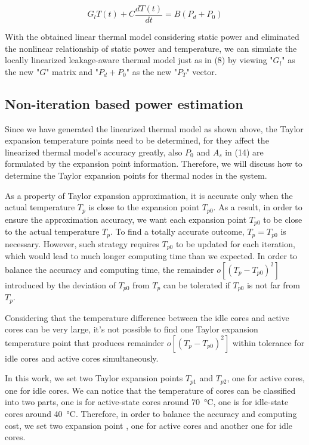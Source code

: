 \begin{equation}\label{gt=bp}
G_{l}T(t) + C\frac{dT(t)}{dt} = B(P_{d} + P_{0})
\end{equation}

With the obtained linear thermal model considering static power and eliminated the nonlinear relationship of static power and temperature, we can simulate the locally linearized leakage-aware thermal model just as in (8) by viewing "$G_{l}$" as the new "$G$" matrix and "$P_{d} + P_{0}$" as the new "$P_{T}$" vector.

\subsection{Non-iteration based power estimation}
Since we have generated the linearized thermal model as shown above, the Taylor expansion temperature points need to be determined, for they affect the linearized thermal model's accuracy greatly, also $P_{0}$ and $A_{s}$ in (14) are formulated by the expansion point information. Therefore, we will discuss how to determine the Taylor expansion points for thermal nodes in the system. 

As a property of Taylor expansion approximation, it is accurate only when the actual temperature $T_{p}$ is close to the expansion point $T_{p0}$. As a result, in order to ensure the approximation accuracy, we want each expansion point $T_{p0}$ to be close to the actual temperature $T_{p}$. To find a totally accurate outcome, $T_{p} = T_{p0}$ is necessary. However, such strategy requires $T_{p0}$ to be updated for each iteration, which would lead to much longer computing time than we expected. In order to balance the accuracy and computing time, the remainder $o[(T_{p}-T_{p0})^{2}]$ introduced by the deviation of $T_{p0}$ from $T_{p}$ can be tolerated if $T_{p0}$ is not far from $T_{p}$.

Considering that the temperature difference between the idle cores and active cores can be very large, it's not possible to find one Taylor expansion temperature point that produces remainder $o[(T_{p}-T_{p0})^{2}]$ within tolerance for idle cores and active cores simultaneously.

In this work, we set two Taylor expansion points $T_{p1}$ and $T_{p2}$, one for active cores, one for idle cores.
We can notice that the temperature of cores can be classified into two parts, one is for active-state cores around \SI{70}{\degreeCelsius}, one is for idle-state cores around \SI{40}{\degreeCelsius}. Therefore, in order to balance the accuracy and computing cost, we set two expansion point , one for active cores and another one for idle cores.

